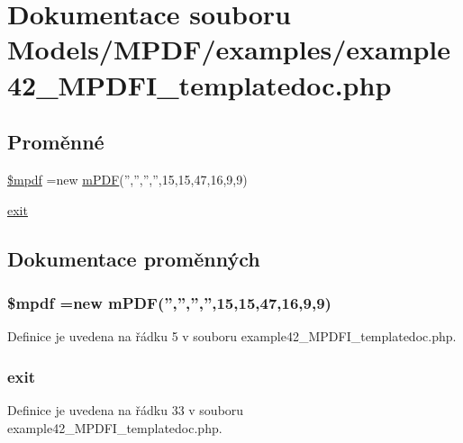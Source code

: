 \hypertarget{example42___m_p_d_f_i__templatedoc_8php}{\section{Dokumentace souboru Models/\-M\-P\-D\-F/examples/example42\-\_\-\-M\-P\-D\-F\-I\-\_\-templatedoc.php}
\label{example42___m_p_d_f_i__templatedoc_8php}
}
\subsection*{Proměnné}
\begin{DoxyCompactItemize}
\item 
\hyperlink{example42___m_p_d_f_i__templatedoc_8php_ad028f81910d6cbab9b184d2214b3a8f8}{\$mpdf} =new \hyperlink{classm_p_d_f}{m\-P\-D\-F}('','','','',15,15,47,16,9,9)
\item 
\hyperlink{example42___m_p_d_f_i__templatedoc_8php_a6733eb5f605d09eaede9845835d71c4e}{exit}
\end{DoxyCompactItemize}


\subsection{Dokumentace proměnných}
\hypertarget{example42___m_p_d_f_i__templatedoc_8php_ad028f81910d6cbab9b184d2214b3a8f8}{
\subsubsection[{\$mpdf}]{\setlength{\rightskip}{0pt plus 5cm}\$mpdf =new {\bf m\-P\-D\-F}('','','','',15,15,47,16,9,9)}}\label{example42___m_p_d_f_i__templatedoc_8php_ad028f81910d6cbab9b184d2214b3a8f8}


Definice je uvedena na řádku 5 v souboru example42\-\_\-\-M\-P\-D\-F\-I\-\_\-templatedoc.\-php.

\hypertarget{example42___m_p_d_f_i__templatedoc_8php_a6733eb5f605d09eaede9845835d71c4e}{
\subsubsection[{exit}]{\setlength{\rightskip}{0pt plus 5cm}exit}}\label{example42___m_p_d_f_i__templatedoc_8php_a6733eb5f605d09eaede9845835d71c4e}


Definice je uvedena na řádku 33 v souboru example42\-\_\-\-M\-P\-D\-F\-I\-\_\-templatedoc.\-php.

